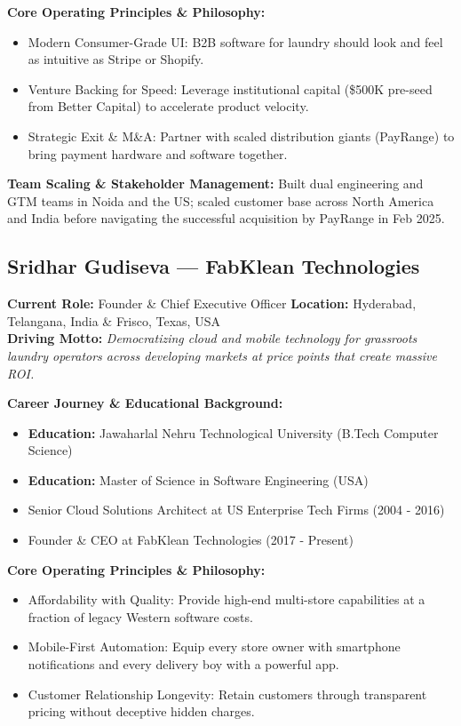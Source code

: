 \documentclass[11pt,a4paper]{article}
\begin{document}
\textbf{Core Operating Principles \& Philosophy:}
\begin{itemize}[leftmargin=*]
    \item Modern Consumer-Grade UI: B2B software for laundry should look and feel as intuitive as Stripe or Shopify.
    \item Venture Backing for Speed: Leverage institutional capital (\$500K pre-seed from Better Capital) to accelerate product velocity.
    \item Strategic Exit \& M\&A: Partner with scaled distribution giants (PayRange) to bring payment hardware and software together.
\end{itemize}

\textbf{Team Scaling \& Stakeholder Management:} Built dual engineering and GTM teams in Noida and the US; scaled customer base across North America and India before navigating the successful acquisition by PayRange in Feb 2025.

\subsection{Sridhar Gudiseva --- FabKlean Technologies}
\textbf{Current Role:} Founder \& Chief Executive Officer \quad \textbf{Location:} Hyderabad, Telangana, India \& Frisco, Texas, USA\\
\textbf{Driving Motto:} \textit{Democratizing cloud and mobile technology for grassroots laundry operators across developing markets at price points that create massive ROI.}

\textbf{Career Journey \& Educational Background:}
\begin{itemize}[leftmargin=*]
    \item \textbf{Education:} Jawaharlal Nehru Technological University (B.Tech Computer Science)
    \item \textbf{Education:} Master of Science in Software Engineering (USA)
    \item Senior Cloud Solutions Architect at US Enterprise Tech Firms (2004 - 2016)
    \item Founder \& CEO at FabKlean Technologies (2017 - Present)
\end{itemize}

\textbf{Core Operating Principles \& Philosophy:}
\begin{itemize}[leftmargin=*]
    \item Affordability with Quality: Provide high-end multi-store capabilities at a fraction of legacy Western software costs.
    \item Mobile-First Automation: Equip every store owner with smartphone notifications and every delivery boy with a powerful app.
    \item Customer Relationship Longevity: Retain customers through transparent pricing without deceptive hidden charges.
\end{itemize}
\end{document}
